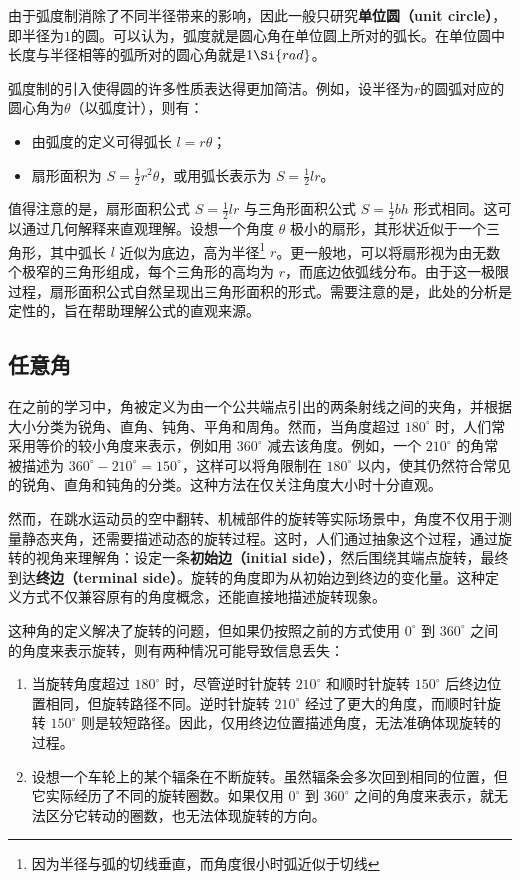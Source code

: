 由于弧度制消除了不同半径带来的影响，因此一般只研究\textbf{单位圆（unit circle）}，即半径为$1$的圆。可以认为，弧度就是圆心角在单位圆上所对的弧长。在单位圆中长度与半径相等的弧所对的圆心角就是$1 \Si{rad}$。

弧度制的引入使得圆的许多性质表达得更加简洁。例如，设半径为$r$的圆弧对应的圆心角为$\theta$（以弧度计），则有：
\begin{itemize}
\item 由弧度的定义可得弧长 $l = r\theta$；
\item 扇形面积为 $\displaystyle S = \frac{1}{2} r^2 \theta$，或用弧长表示为 $\displaystyle S = \frac{1}{2} l r$。
\end{itemize}

值得注意的是，扇形面积公式 $\displaystyle S = \frac{1}{2} l r$ 与三角形面积公式 $\displaystyle S = \frac{1}{2} bh$ 形式相同。这可以通过几何解释来直观理解。设想一个角度 $\theta$ 极小的扇形，其形状近似于一个三角形，其中弧长 $l$ 近似为底边，高为半径\footnote{因为半径与弧的切线垂直，而角度很小时弧近似于切线} $r$。更一般地，可以将扇形视为由无数个极窄的三角形组成，每个三角形的高均为 $r$，而底边依弧线分布。由于这一极限过程，扇形面积公式自然呈现出三角形面积的形式。需要注意的是，此处的分析是定性的，旨在帮助理解公式的直观来源。


\subsection{任意角}

在之前的学习中，角被定义为由一个公共端点引出的两条射线之间的夹角，并根据大小分类为锐角、直角、钝角、平角和周角。然而，当角度超过 $180^\circ$ 时，人们常采用等价的较小角度来表示，例如用 $360^\circ$ 减去该角度。例如，一个 $210^\circ$ 的角常被描述为 $360^\circ - 210^\circ = 150^\circ$，这样可以将角限制在 $180^\circ$ 以内，使其仍然符合常见的锐角、直角和钝角的分类。这种方法在仅关注角度大小时十分直观。

然而，在跳水运动员的空中翻转、机械部件的旋转等实际场景中，角度不仅用于测量静态夹角，还需要描述动态的旋转过程。这时，人们通过抽象这个过程，通过旋转的视角来理解角：设定一条\textbf{初始边（initial side）}，然后围绕其端点旋转，最终到达\textbf{终边（terminal side）}。旋转的角度即为从初始边到终边的变化量。这种定义方式不仅兼容原有的角度概念，还能直接地描述旋转现象。

这种角的定义解决了旋转的问题，但如果仍按照之前的方式使用 $0^\circ$ 到 $360^\circ$ 之间的角度来表示旋转，则有两种情况可能导致信息丢失：
\begin{enumerate}
\item 当旋转角度超过 $180^\circ$ 时，尽管逆时针旋转 $210^\circ$ 和顺时针旋转 $150^\circ$ 后终边位置相同，但旋转路径不同。逆时针旋转 $210^\circ$ 经过了更大的角度，而顺时针旋转 $150^\circ$ 则是较短路径。因此，仅用终边位置描述角度，无法准确体现旋转的过程。
\item 设想一个车轮上的某个辐条在不断旋转。虽然辐条会多次回到相同的位置，但它实际经历了不同的旋转圈数。如果仅用 $0^\circ$ 到 $360^\circ$ 之间的角度来表示，就无法区分它转动的圈数，也无法体现旋转的方向。
\end{enumerate}

